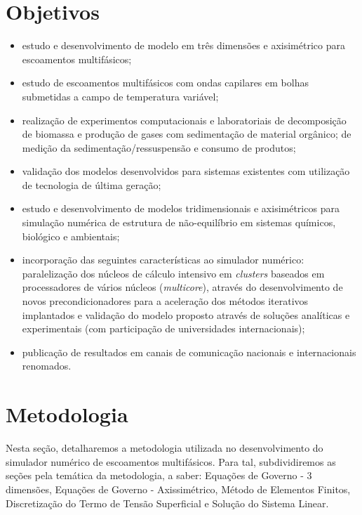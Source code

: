 \documentclass[a4paper,portuges,12pt]{article}
\begin{document}
\section{Objetivos}

\begin{itemize}
	\item estudo e desenvolvimento de modelo em três dimensões e axisimétrico
	      para escoamentos multifásicos;
	\item estudo de escoamentos multifásicos com ondas capilares em bolhas
	      submetidas a campo de temperatura variável;
	\item realização de experimentos computacionais e laboratoriais de
		  decomposição de biomassa e produção de gases com sedimentação
		  de material orgânico; de medição da sedimentação/ressuspensão
		  e consumo de produtos;
	\item validação dos modelos desenvolvidos para sistemas existentes com
	      utilização de tecnologia de última geração;
	\item estudo e desenvolvimento de modelos tridimensionais e axisimétricos
		  para simulação numérica de estrutura de não-equilíbrio em
		  sistemas químicos, biológico e ambientais;
	\item incorporação das seguintes características ao simulador numérico:
		  paralelização dos núcleos de cálculo intensivo em
		  \textit{clusters} baseados em processadores de vários núcleos
		  (\textit{multicore}), através do desenvolvimento de novos
		  precondicionadores para a aceleração dos métodos iterativos
		  implantados e validação do modelo proposto através de soluções
		  analíticas e experimentais (com participação de universidades
		  internacionais);
	\item publicação de resultados em canais de comunicação nacionais e
	      internacionais renomados.
\end{itemize}

\section{Metodologia}

Nesta seção, detalharemos a metodologia utilizada no desenvolvimento do
simulador numérico de escoamentos multifásicos. Para tal, subdividiremos
as seções pela temática da metodologia, a saber: Equações de Governo - 3
dimensões, Equações de Governo - Axissimétrico,
Método de Elementos Finitos, Discretização do Termo de Tensão
Superficial e Solução do Sistema Linear.
\end{document}
